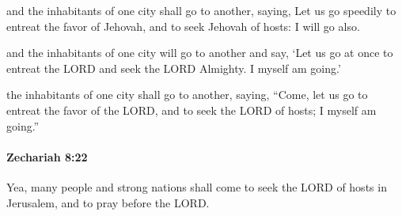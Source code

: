 			\begin{versebox}
					\item[BHS] 
					\item[LXX] 
					\item[ASV] and the inhabitants of one city shall go to another, saying, Let us go speedily to entreat the favor of Jehovah, and to seek Jehovah of hosts: I will go also.
					\item[NIV] and the inhabitants of one city will go to another and say, ‘Let us go at once to entreat the LORD and seek the LORD Almighty. I myself am going.’
					\item[NRSV] the inhabitants of one city shall go to another, saying, “Come, let us go to entreat the favor of the LORD, and to seek the LORD of hosts; I myself am going.”
			\end{versebox}

		\paragraph{Zechariah 8:22} %
			\label{ZECHARIAH-8-22}

			Yea, many people and strong nations shall come to seek the LORD of hosts in Jerusalem, and to pray before the LORD.

